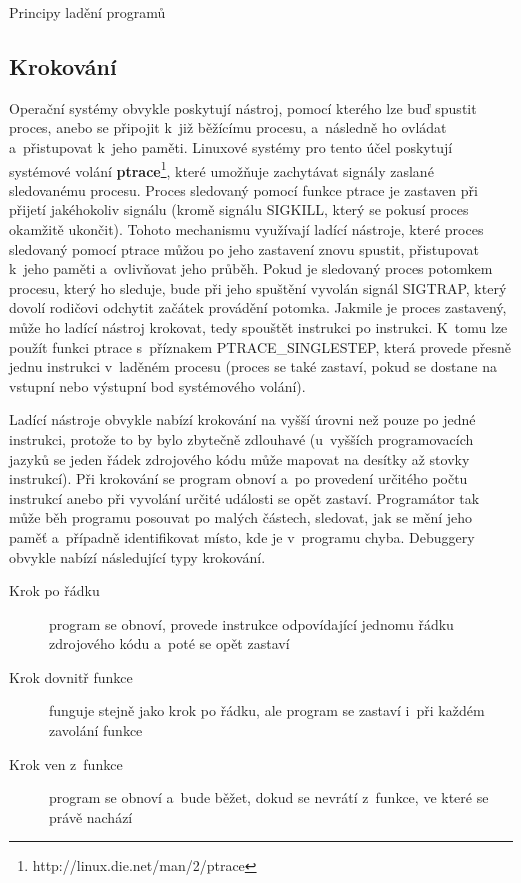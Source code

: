 \documentclass[czech,bachelor,male,python,dept460,hidelinks]{diploma}						%
\newcommand{\parspace}[1][]{
	\ifthenelse{\isempty{#1}}{\vspace{0mm}}{\vspace{#1}}
	\par
}
\begin{document}
\begin{section}{Principy ladění programů}
	\subsection{Krokování}
		Operační systémy obvykle poskytují nástroj, pomocí kterého lze buď spustit proces, anebo se připojit k~již běžícímu procesu, a~následně ho ovládat
		a~přistupovat k~jeho paměti. Linuxové systémy pro tento účel poskytují systémové volání \textbf{ptrace}\footnote{http://linux.die.net/man/2/ptrace},
		které umožňuje zachytávat signály zaslané sledovanému procesu. Proces sledovaný pomocí funkce ptrace je zastaven při přijetí jakéhokoliv signálu
		(kromě signálu SIGKILL, který se pokusí proces okamžitě ukončit). Tohoto mechanismu využívají ladící nástroje, které proces sledovaný pomocí
		ptrace můžou po jeho zastavení znovu spustit, přistupovat k~jeho paměti a~ovlivňovat jeho průběh. Pokud je sledovaný proces potomkem procesu,
		který ho sleduje, bude při jeho spuštění vyvolán signál SIGTRAP, který dovolí rodičovi odchytit začátek provádění potomka. Jakmile je proces
		zastavený, může ho ladící nástroj krokovat, tedy spouštět instrukci po instrukci. K~tomu lze použít funkci ptrace s~příznakem PTRACE\_SINGLESTEP,
		která provede přesně jednu instrukci v~laděném procesu (proces se také zastaví, pokud se dostane na vstupní nebo výstupní bod systémového volání).
		
		\parspace Ladící nástroje obvykle nabízí krokování na vyšší úrovni než pouze po jedné instrukci, protože to by bylo zbytečně zdlouhavé (u~vyšších
		programovacích jazyků se jeden řádek zdrojového kódu může mapovat na desítky až stovky instrukcí).
		Při krokování se program obnoví a~po provedení určitého počtu instrukcí anebo při vyvolání určité události se opět zastaví. Programátor tak může
		běh programu posouvat po malých částech, sledovat, jak se mění jeho paměť a~případně identifikovat místo, kde je v~programu chyba.
		Debuggery obvykle nabízí následující typy krokování.
		
		\begin{description}
			\item[Krok po řádku] program se obnoví, provede instrukce odpovídající jednomu řádku zdrojového kódu a~poté se opět zastaví
			\item[Krok dovnitř funkce] funguje stejně jako krok po řádku, ale program se zastaví i~při každém zavolání funkce
			\item[Krok ven z~funkce] program se obnoví a~bude běžet, dokud se nevrátí z~funkce, ve které se právě nachází
		\end{description}
		

\end{section}
\end{document}
